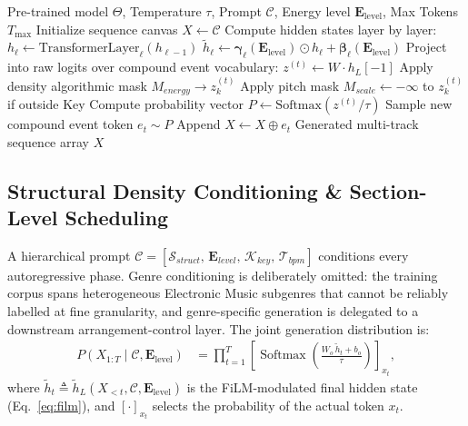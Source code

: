 \documentclass[pdflatex,sn-mathphys-num,twocolumn]{sn-jnl}
\theoremstyle{thmstyleone}
\theoremstyle{thmstyletwo}
\begin{document}
\begin{algorithm*}[!t]
\caption{PulseFormer Steerable Multi-Track Inference}
\label{alg:pulseformer}
\begin{algorithmic}[1]
\REQUIRE Pre-trained model $\Theta$, Temperature $\tau$, Prompt $\mathcal{C}$, Energy level $\mathbf{E}_{\mathrm{level}}$, Max Tokens $T_{\max}$
\STATE Initialize sequence canvas $X \leftarrow \mathcal{C}$
    \STATE Compute hidden states layer by layer:
        \STATE $h_\ell \leftarrow \text{TransformerLayer}_\ell(h_{\ell-1})$ \hfill{}
        \STATE $\tilde{h}_\ell \leftarrow \boldsymbol{\gamma}_\ell(\mathbf{E}_{\mathrm{level}}) \odot h_\ell + \boldsymbol{\beta}_\ell(\mathbf{E}_{\mathrm{level}})$ \hfill{}
    \ENDFOR
    \STATE Project into raw logits over compound event vocabulary: $z^{(t)} \leftarrow W \cdot h_L[-1]$
            \STATE Apply density algorithmic mask $M_{energy} \to z_k^{(t)}$
        \ENDIF
            \STATE Apply pitch mask $M_{scale} \leftarrow -\infty$ to $z_k^{(t)}$ if outside Key
        \ENDIF
    \ENDFOR
    \STATE Compute probability vector $P \leftarrow \text{Softmax}(z^{(t)} / \tau)$
    \STATE Sample new compound event token $e_t \sim P$
    \STATE Append $X \leftarrow X \oplus e_t$
\ENDFOR
\RETURN Generated multi-track sequence array $X$
\end{algorithmic}
\end{algorithm*}

\subsection{Structural Density Conditioning \& Section-Level Scheduling}
\label{sec:cond}
A hierarchical prompt $\mathcal{C} = [\mathcal{S}_{struct},\,\mathbf{E}_{level},\,\mathcal{K}_{key},\,\mathcal{T}_{bpm}]$ conditions every autoregressive phase. Genre conditioning is deliberately omitted: the training corpus spans heterogeneous Electronic Music subgenres that cannot be reliably labelled at fine granularity, and genre-specific generation is delegated to a downstream arrangement-control layer. The joint generation distribution is:
\begin{align}
P(X_{1:T}\mid\mathcal{C},\mathbf{E}_{\mathrm{level}})
  &= \prod_{t=1}^{T}
     \!\left[\operatorname{Softmax}\!\left(\tfrac{W_o\,\tilde{h}_t+b_o}{\tau}\right)\right]_{x_t},
\end{align}
where $\tilde{h}_t \triangleq \tilde{h}_L(X_{<t},\mathcal{C},\mathbf{E}_{\mathrm{level}})$ is the FiLM-modulated final hidden state (Eq.~\eqref{eq:film}), and $[\cdot]_{x_t}$ selects the probability of the actual token $x_t$.
\end{document}
